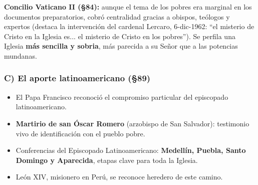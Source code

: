 \documentclass[10pt,a4paper]{article}
\begin{document}
\noindent \textbf{Concilio Vaticano II (\S{}84):} aunque el tema de los pobres era marginal en los documentos preparatorios, cobró centralidad gracias a obispos, teólogos y expertos (destaca la intervención del cardenal Lercaro, 6-dic-1962: ``el misterio de Cristo en la Iglesia es... el misterio de Cristo en los pobres''). Se perfila una Iglesia \textbf{más sencilla y sobria}, más parecida a su Señor que a las potencias mundanas.\par\smallskip

\subsubsection{C) El aporte latinoamericano (\S{}89)}
\begin{itemize}
\item El Papa Francisco reconoció el compromiso particular del episcopado latinoamericano.
\item \textbf{Martirio de san Óscar Romero} (arzobispo de San Salvador): testimonio vivo de identificación con el pueblo pobre.
\item Conferencias del Episcopado Latinoamericano: \textbf{Medellín, Puebla, Santo Domingo y Aparecida}, etapas clave para toda la Iglesia.
\item León XIV, misionero en Perú, se reconoce heredero de este camino.
\end{itemize}
\end{document}
